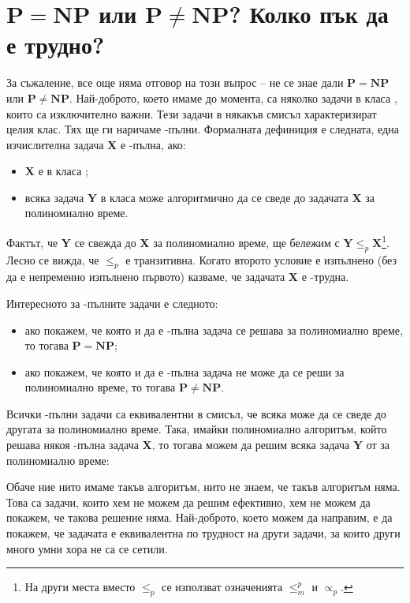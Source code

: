 \section{$\mathbf{P = NP}$ или $\mathbf{P \neq NP}$? Колко пък да е трудно?}

За съжаление, все още няма отговор на този въпрос -- не се знае дали $\mathbf{P = NP}$  или $\mathbf{P \neq NP}$.
Най-доброто, което имаме до момента, са няколко задачи в класа \NP, които са изключително важни.
Тези задачи в някакъв смисъл характеризират целия клас.
Тях ще ги наричаме \NP-пълни.
Формалната дефиниция е следната, една изчислителна задача \textbf{X} е \NP-пълна, ако:
\begin{itemize}
    \item \textbf{X} е в класа \NP;
    \item всяка задача \textbf{Y} в класа \NP{ }може алгоритмично да се сведе до задачата \textbf{X} за полиномиално време.
\end{itemize}
Фактът, че \textbf{Y} се свежда до \textbf{X} за полиномиално време, ще бележим с $\mathbf{Y} \leq_p \mathbf{X}$\footnote{На други места вместо $\leq_p$ се използват означенията $\leq^p_m$ и $\propto_p$.}.
Лесно се вижда, че $\leq_p$ е транзитивна.
Когато второто условие е изпълнено (без да е непременно изпълнено първото) казваме, че задачата \textbf{X} е \NP-трудна.

Интересното за \NP-пълните задачи е следното:
\begin{itemize}
    \item ако покажем, че която и да е \NP-пълна задача се решава за полиномиално време, то тогава $\mathbf{P = NP}$;
    \item ако покажем, че която и да е \NP-пълна задача не може да се реши за полиномиално време, то тогава $\mathbf{P \neq NP}$.
\end{itemize}
Всички \NP-пълни задачи са еквивалентни в смисъл, че всяка може да се сведе до другата за полиномиално време.
Така, имайки полиномиално алгоритъм, който решава някоя \NP-пълна задача \textbf{X}, то тогава можем да решим всяка задача \textbf{Y} от \NP{} за полиномиално време:

Обаче ние нито имаме такъв алгоритъм, нито не знаем, че такъв алгоритъм няма.
Това са задачи, които хем не можем да решим ефективно, хем не можем да покажем, че такова решение няма.
Най-доброто, което можем да направим, е да покажем, че задачата е еквивалентна по трудност на други задачи, за които други много умни хора не са се сетили.


